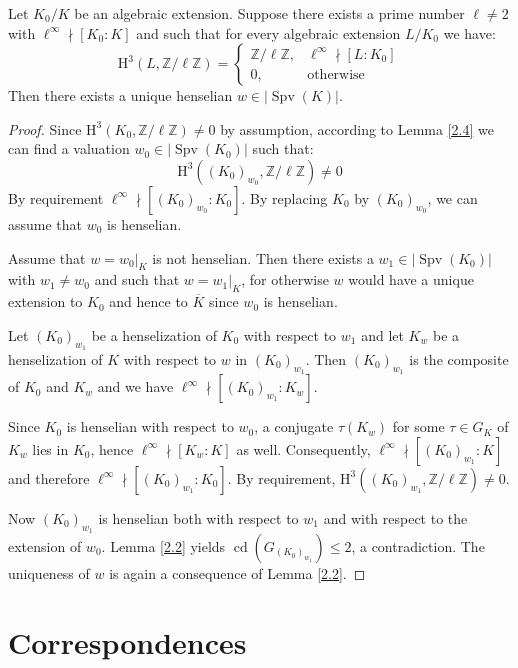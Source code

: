 \begin{proposition}\label{2.6}
Let $K_0/K$ be an algebraic extension. Suppose there exists a prime number $\ell\neq 2$ with $\ell^\infty\nmid[K_0:K]$ and such that for every algebraic extension $L/K_0$ we have: 
\[ \mathrm{H}^3(L,\mathbb{Z}/\ell\mathbb{Z}) = \begin{cases}
\mathbb{Z}/\ell\mathbb{Z}, & \ell^\infty\nmid [L:K_0]\\
0, & \text{otherwise}
\end{cases} \]
Then there exists a unique henselian $w\in|\operatorname{Spv}(K)|$.
\end{proposition}

\begin{proof}
Since $\mathrm{H}^3(K_0, \mathbb{Z}/\ell\mathbb{Z})\neq 0$ by assumption, according to Lemma \ref{2.4} we can find a valuation $w_0\in|\operatorname{Spv}(K_0)|$ such that:
\[ \mathrm{H}^3((K_0)_{w_0}, \mathbb{Z}/\ell\mathbb{Z}) \neq 0 \]
By requirement $\ell^\infty \nmid [(K_0)_{w_0} : K_0]$. By replacing $K_0$ by $(K_0)_{w_0}$, we can assume that $w_0$ is henselian.

Assume that $w = w_0|_K$ is not henselian. Then there exists a $w_1\in|\operatorname{Spv}(K_0)|$ with $w_1\neq w_0$ and such that $w = w_1|_K$, for otherwise $w$ would have a unique extension to $K_0$ and hence to $\overline{K}$ since $w_0$ is henselian.

Let $(K_0)_{w_1}$ be a henselization of $K_0$ with respect to $w_1$ and let $K_w$ be a henselization of $K$ with respect to $w$ in $(K_0)_{w_1}$. Then $(K_0)_{w_1}$ is the composite of $K_0$ and $K_w$ and we have $\ell^\infty\nmid [(K_0)_{w_1} : K_w]$.

Since $K_0$ is henselian with respect to $w_0$, a conjugate $\tau(K_w)$ for some $\tau\in G_K$ of $K_w$ lies in $K_0$, hence $\ell^\infty\nmid [K_w : K]$ as well. Consequently, $\ell^\infty \nmid [(K_0)_{w_1} : K]$ and therefore $\ell^\infty \nmid [(K_0)_{w_1} : K_0]$. By requirement, $\mathrm{H}^3((K_0)_{w_1}, \mathbb{Z}/\ell\mathbb{Z}) \neq 0$.

Now $(K_0)_{w_1}$ is henselian both with respect to $w_1$ and with respect to the extension of $w_0$. Lemma \ref{2.2} yields $\operatorname{cd}(G_{(K_0)_{w_1}})\leq 2$, a contradiction. The uniqueness of $w$ is again a consequence of Lemma \ref{2.2}.
\end{proof}

\chapter{Correspondences}

